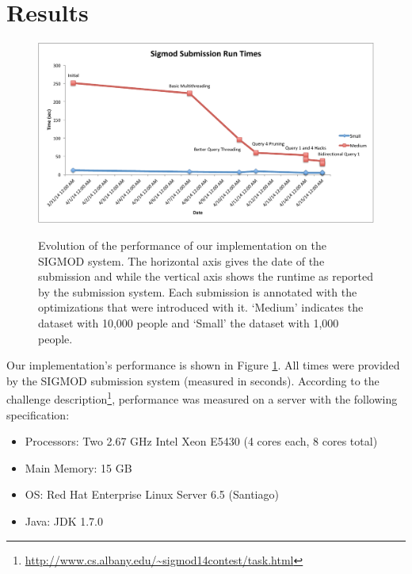 \documentclass{article}
\begin{document}
\section{Results}
\label{sec:results}
\begin{figure}
  \centering
  \includegraphics[scale=0.5]{img/results.pdf}
  \label{fig:results}
  \caption{Evolution of the performance of our implementation on the
    SIGMOD system.  The horizontal axis gives the date of the
    submission and while the vertical axis shows the runtime as
    reported by the submission system.  Each submission is annotated
    with the optimizations that were introduced with it.  `Medium'
    indicates the dataset with 10,000 people and `Small' the dataset
    with 1,000 people.}
\end{figure}

Our implementation's performance is shown in Figure \ref{fig:results}.  All times were provided by the SIGMOD submission system (measured in seconds).  According to the challenge description\footnote{\url{http://www.cs.albany.edu/~sigmod14contest/task.html}}, performance was measured on a server with the following specification:
\begin{itemize}
\item Processors: Two 2.67 GHz Intel Xeon E5430 (4 cores each, 8 cores total)
\item Main Memory: 15 GB
\item OS: Red Hat Enterprise Linux Server 6.5 (Santiago) 
\item Java: JDK 1.7.0
\end{itemize}
\end{document}
